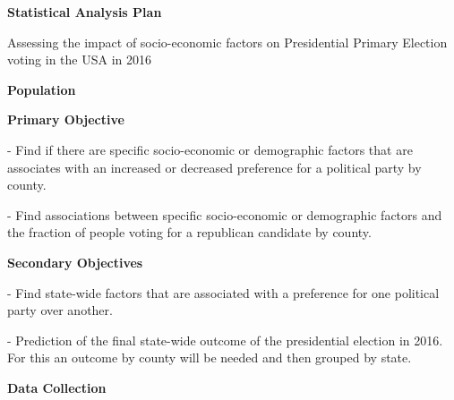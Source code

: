 \documentclass[
12pt, 
english, 
oneside,
doublespacing, %
nolistspacing, %
headsepline, %
]{../Thesis} %
\begin{document}
\frontmatter

\pagestyle{plain}


\mainmatter

{\bfseries\noindent\huge{Statistical Analysis Plan}}

{\noindent\Large{Assessing the impact of socio-economic factors on Presidential Primary Election voting in the USA in 2016}} %


\vspace{3ex}
{\bfseries\noindent\large{Population}}



\vspace{3ex}
{\bfseries\noindent\large{Primary Objective}}

- Find if there are specific socio-economic or demographic factors that are associates with an increased or decreased preference for a political party by county.

- Find associations between specific socio-economic or demographic factors and the fraction of people voting for a republican candidate by county.


\vspace{3ex}
{\bfseries\noindent\large{Secondary Objectives}}

- Find state-wide factors that are associated with a preference for one political party over another.

- Prediction of the final state-wide outcome of the presidential election in 2016. For this an outcome by county will be needed and then grouped by state.


\vspace{3ex}
{\bfseries\noindent\large{Data Collection}}
\end{document}
